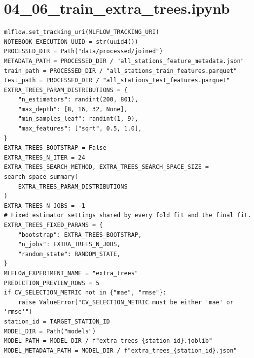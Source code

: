 \section{04\_06\_train\_extra\_trees.ipynb}

\begin{verbatim}
mlflow.set_tracking_uri(MLFLOW_TRACKING_URI)
NOTEBOOK_EXECUTION_UUID = str(uuid4())
PROCESSED_DIR = Path("data/processed/joined")
METADATA_PATH = PROCESSED_DIR / "all_stations_feature_metadata.json"
train_path = PROCESSED_DIR / "all_stations_train_features.parquet"
test_path = PROCESSED_DIR / "all_stations_test_features.parquet"
EXTRA_TREES_PARAM_DISTRIBUTIONS = {
    "n_estimators": randint(200, 801),
    "max_depth": [8, 16, 32, None],
    "min_samples_leaf": randint(1, 9),
    "max_features": ["sqrt", 0.5, 1.0],
}
EXTRA_TREES_BOOTSTRAP = False
EXTRA_TREES_N_ITER = 24
EXTRA_TREES_SEARCH_METHOD, EXTRA_TREES_SEARCH_SPACE_SIZE = search_space_summary(
    EXTRA_TREES_PARAM_DISTRIBUTIONS
)
EXTRA_TREES_N_JOBS = -1
# Fixed estimator settings shared by every fold fit and the final fit.
EXTRA_TREES_FIXED_PARAMS = {
    "bootstrap": EXTRA_TREES_BOOTSTRAP,
    "n_jobs": EXTRA_TREES_N_JOBS,
    "random_state": RANDOM_STATE,
}
MLFLOW_EXPERIMENT_NAME = "extra_trees"
PREDICTION_PREVIEW_ROWS = 5
if CV_SELECTION_METRIC not in {"mae", "rmse"}:
    raise ValueError("CV_SELECTION_METRIC must be either 'mae' or 'rmse'")
station_id = TARGET_STATION_ID
MODEL_DIR = Path("models")
MODEL_PATH = MODEL_DIR / f"extra_trees_{station_id}.joblib"
MODEL_METADATA_PATH = MODEL_DIR / f"extra_trees_{station_id}.json"
\end{verbatim}


